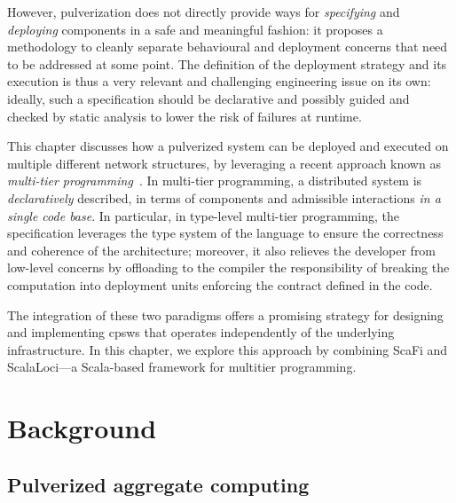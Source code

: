 However, pulverization does not directly provide ways for \emph{specifying} and \emph{deploying} components in a safe and meaningful fashion:
 it proposes a methodology to cleanly separate behavioural and deployment concerns that need to be addressed at some point.
%
The definition of the deployment strategy and its execution is thus a very relevant and challenging engineering issue on its own:
 ideally, such a specification should be declarative
 and possibly guided and checked by static analysis
 to lower the risk of failures at runtime.

This chapter discusses how a pulverized system can be deployed and executed on multiple different network structures,
 by leveraging a recent approach known as \emph{multi-tier programming}~\cite{DBLP:journals/csur/WeisenburgerWS20}.
%
In multi-tier programming, 
 a distributed system is \emph{declaratively} described, 
 in terms of components and admissible interactions \emph{in a single code base}.
%
In particular, in type-level multi-tier programming, 
 the specification leverages the type system of the language to ensure the correctness and coherence of the architecture;
moreover, 
 it also relieves the developer from low-level concerns 
 by offloading to the compiler
 the responsibility of breaking the computation into deployment units %
 enforcing the contract defined in the code.
%

The integration of these two paradigms offers a promising strategy for designing and implementing \acp{cpsw} 
 that operates independently of the underlying infrastructure. 
 In this chapter, we explore this approach by combining ScaFi and ScalaLoci---a Scala-based framework for multitier programming.
\section{Background}
\label{background}
\subsection{Pulverized aggregate computing}

